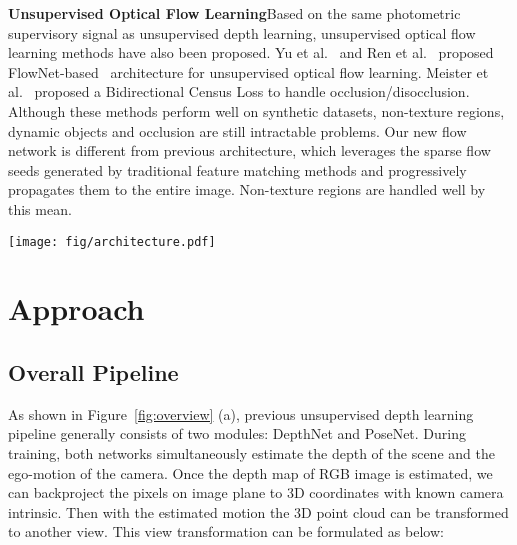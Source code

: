 \documentclass[10pt,twocolumn,letterpaper]{article}
\begin{document}
\textbf{Unsupervised Optical Flow Learning}\quad Based on the same photometric supervisory signal as unsupervised depth learning, unsupervised optical flow learning methods have also been proposed. Yu et al.~\cite{jason2016back} and Ren et al.~\cite{ren2017unsupervised} proposed FlowNet-based~\cite{ilg2017flownet} architecture for unsupervised optical flow learning. Meister et al.~\cite{meister2018unflow} proposed a Bidirectional Census Loss to handle occlusion/disocclusion. Although these methods perform well on synthetic datasets, non-texture regions, dynamic objects and occlusion are still intractable problems. Our new flow network is different from previous architecture, which leverages the sparse flow seeds generated by traditional feature matching methods and progressively propagates them to the entire image. Non-texture regions are handled well by this mean.

\begin{figure*}
\begin{center}
  \texttt{[image: fig/architecture.pdf]}
\end{center}
   \vspace{-3mm}
   \caption{Overview of previous pipeline (a) and our pipeline (b). The supervisory signal of previous pipeline is based on appearance matching of two images, which is unstable and suffers from non-texture regions. We use the optical flow results generated by our flow estimation network SF-Net as supervision and modify the input of PoseNet.}
\label{fig:overview}
\vspace{-2mm}
\end{figure*}


\section{Approach}

\subsection{Overall Pipeline}

As shown in Figure~\ref{fig:overview} (a), previous unsupervised depth learning pipeline generally consists of two modules: DepthNet and PoseNet. During training, both networks simultaneously estimate the depth of the scene and the ego-motion of the camera. Once the depth map of RGB image is estimated, we can backproject the pixels on image plane to 3D coordinates with known camera intrinsic. Then with the estimated motion the 3D point cloud can be transformed to another view. This view transformation can be formulated as below:
\end{document}
